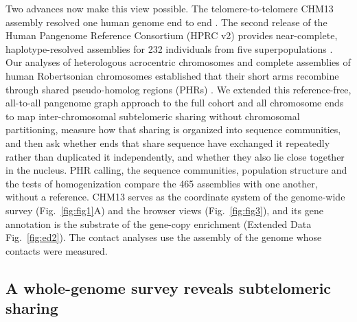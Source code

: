 \documentclass[pdflatex,mathphys]{jnl}
\begin{document}
Two advances now make this view possible.
The telomere-to-telomere CHM13 assembly resolved one human genome end to end
\cite{Nurk2022}.
The second release of the Human Pangenome Reference Consortium (HPRC v2)
provides near-complete, haplotype-resolved assemblies for 232 individuals from
five superpopulations \cite{hprc_hprcv2_2025}.
Our analyses of heterologous acrocentric chromosomes and complete assemblies
of human Robertsonian chromosomes established that their short arms recombine
through shared pseudo-homolog regions (PHRs)
\cite{Guarracino2023,acrocentric_rdna_robertsonian_deLima2025}. We extended this reference-free, all-to-all pangenome graph approach to the full cohort and all chromosome ends to map inter-chromosomal subtelomeric sharing without chromosomal partitioning, measure how that sharing is organized into sequence communities, and then ask whether ends that share sequence have exchanged it repeatedly rather than duplicated it independently, and whether they also lie close together in the nucleus.
PHR calling, the sequence communities, population structure and the tests of homogenization compare
the 465 assemblies with one another, without a reference. CHM13 serves as the coordinate system of the
genome-wide survey (Fig.~\ref{fig:fig1}A) and the browser views (Fig.~\ref{fig:fig3}), and its gene
annotation is the substrate of the gene-copy enrichment (Extended Data Fig.~\ref{fig:ed2}). The contact
analyses use the assembly of the genome whose contacts were measured.

\subsection*{A whole-genome survey reveals subtelomeric sharing}
\end{document}
